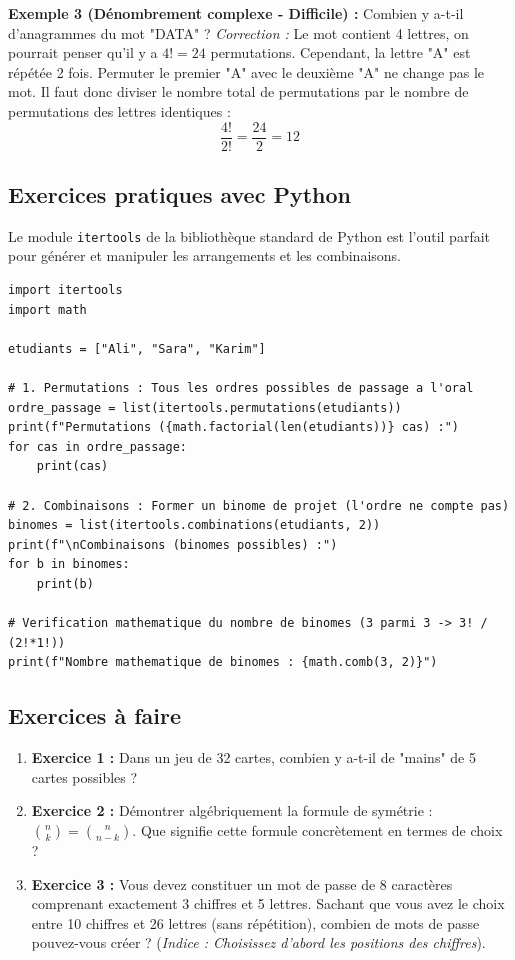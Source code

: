 \documentclass[12pt,a4paper]{report}
\begin{document}
\textbf{Exemple 3 (Dénombrement complexe - Difficile) :}
Combien y a-t-il d'anagrammes du mot "DATA" ?
\textit{Correction :} Le mot contient 4 lettres, on pourrait penser qu'il y a $4! = 24$ permutations. Cependant, la lettre "A" est répétée 2 fois. Permuter le premier "A" avec le deuxième "A" ne change pas le mot. Il faut donc diviser le nombre total de permutations par le nombre de permutations des lettres identiques :
$$ \frac{4!}{2!} = \frac{24}{2} = 12 $$

\subsection{Exercices pratiques avec Python}
Le module \texttt{itertools} de la bibliothèque standard de Python est l'outil parfait pour générer et manipuler les arrangements et les combinaisons. 

\begin{lstlisting}
import itertools
import math

etudiants = ["Ali", "Sara", "Karim"]

# 1. Permutations : Tous les ordres possibles de passage a l'oral
ordre_passage = list(itertools.permutations(etudiants))
print(f"Permutations ({math.factorial(len(etudiants))} cas) :")
for cas in ordre_passage:
    print(cas)

# 2. Combinaisons : Former un binome de projet (l'ordre ne compte pas)
binomes = list(itertools.combinations(etudiants, 2))
print(f"\nCombinaisons (binomes possibles) :")
for b in binomes:
    print(b)
    
# Verification mathematique du nombre de binomes (3 parmi 3 -> 3! / (2!*1!))
print(f"Nombre mathematique de binomes : {math.comb(3, 2)}")
\end{lstlisting}

\subsection{Exercices à faire}
\begin{enumerate}
    \item \textbf{Exercice 1 :} Dans un jeu de 32 cartes, combien y a-t-il de "mains" de 5 cartes possibles ?
    \item \textbf{Exercice 2 :} Démontrer algébriquement la formule de symétrie : $\binom{n}{k} = \binom{n}{n-k}$. Que signifie cette formule concrètement en termes de choix ?
    \item \textbf{Exercice 3 :} Vous devez constituer un mot de passe de 8 caractères comprenant exactement 3 chiffres et 5 lettres. Sachant que vous avez le choix entre 10 chiffres et 26 lettres (sans répétition), combien de mots de passe pouvez-vous créer ? (\textit{Indice : Choisissez d'abord les positions des chiffres}).
\end{enumerate}
\end{document}
